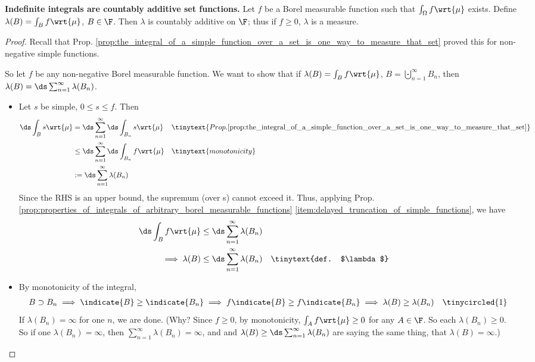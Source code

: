 \documentclass{article} %
\begin{document}
\begin{theorem}{\textbf{Indefinite integrals are countably additive set functions.}}
Let $f$ be a Borel measurable function such that $\int_\Omega f \wrt{\mu}$ exists.  Define $\lambda(B) = \int_B f \wrt{\mu}$, $B \in \F$.  Then $\lambda$ is countably additive on $\F$; thus if $f \geq 0$, $\lambda$ is a measure.	
\label{thm:integrals_are_countably_additive_set_functions}
\end{theorem}

\begin{proof}
Recall that Prop. \ref{prop:the_integral_of_a_simple_function_over_a_set_is_one_way_to_measure_that_set}  proved this for non-negative simple functions.


So let $f$ be any non-negative Borel measurable function.   We want to show that if $\lambda(B) = \int_B f \wrt{\mu}$,  $B = \bigcupdot_{n=1}^\infty B_n$, then $\lambda(B) = \ds\sum_{n=1}^\infty \lambda(B_n)$.

\begin{itemize}
\item \framebox{$\leq$} Let $s$ be simple, $0 \leq s \leq f$.   Then 
\begin{align*}
\ds\int_B s \wrt{\mu} &= \ds\sum_{n=1}^\infty \ds\int_{B_n} s \wrt{\mu} && \tinytext{Prop. \ref{prop:the_integral_of_a_simple_function_over_a_set_is_one_way_to_measure_that_set}} \\
&\leq \ds\sum_{n=1}^\infty \ds\int_{B_n} f \wrt{\mu}  && \tinytext{monotonicity} \\ 
&:= \ds\sum_{n=1}^\infty \lambda(B_n) 	
\end{align*}
Since the RHS is an upper bound, the supremum (over s) cannot exceed it.  Thus, applying Prop. \ref{prop:properties_of_integrals_of_arbitrary_borel_measurable_functions} \ref{item:delayed_truncation_of_simple_functions}, we have 
\begin{align*}
\ds\int_B f \wrt{\mu} & \leq \ds\sum_{n=1}^\infty \lambda(B_n)  \\ 
\implies \lambda(B) &\leq \ds\sum_{n=1}^\infty \lambda(B_n) && \tinytext{def. $\lambda$}
\end{align*}

\item \framebox{$\geq$}	By monotonicity of the integral, 
\begin{align*}
B \supset B_n \implies \indicate{B} \geq \indicate{B_n} \implies  f\indicate{B}   \geq f\indicate{B_n} \implies \lambda(B) \geq \lambda(B_n) && \tinycircled{1}
\end{align*} 
If $\lambda(B_n) =\infty$ for one $n$, we are done. {\tiny (Why? Since $f \geq 0$, by monotonicity, $\int_A f \wrt{\mu} \geq 0$ for any $A \in \F$.  So each $\lambda(B_n) \geq 0$.  So if one $\lambda(B_n) = \infty$, then $\sum_{n=1}^\infty \lambda(B_n) = \infty$, and  and $\lambda(B) \geq \ds\sum_{n=1}^\infty \lambda(B_n)$ are saying the same thing, that $\lambda(B) = \infty$.)}
 

\end{itemize}
\end{proof}
\end{document}
